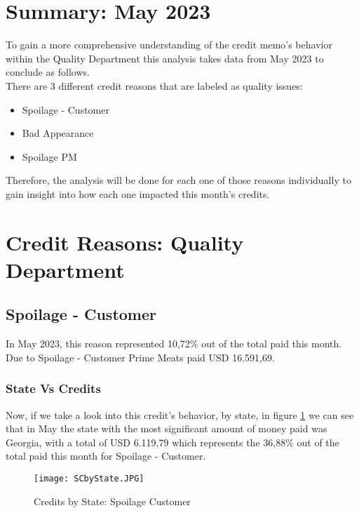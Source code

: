 \documentclass[12pt,a4paper, USA]{article}
\begin{document}
\section{Summary: May 2023}

To gain a more comprehensive understanding of the credit memo's 
behavior within the Quality Department this analysis takes data from May 2023 to conclude as follows.\\
There are 3 different credit reasons that are labeled as quality issues:

\begin{itemize}
    \item {Spoilage - Customer}
    \item{Bad Appearance}
    \item{Spoilage PM}
\end{itemize}

Therefore, the analysis will be done for each one of those reasons individually to gain insight into how each one impacted this month's credits.

\section{Credit Reasons: Quality Department}

\subsection{Spoilage - Customer}

In May 2023, this reason represented 10,72\% out of the total paid this month. Due to Spoilage - Customer Prime Meats paid USD 16.591,69.

\subsubsection{State Vs Credits}

Now, if we take a look into this credit's behavior, by state, in figure \ref{fig: StateVsCreditsSC} we can see that in May the state with the most significant amount of money paid was Georgia, with a total of USD 6.119,79 which represents the 36,88\% out of the total paid this month for Spoilage - Customer. 

\begin{figure}[H]
    \centering
    \texttt{[image: SCbyState.JPG]}
    \caption{Credits by State: Spoilage Customer}
    \label{fig: StateVsCreditsSC}
\end{figure}
\end{document}
